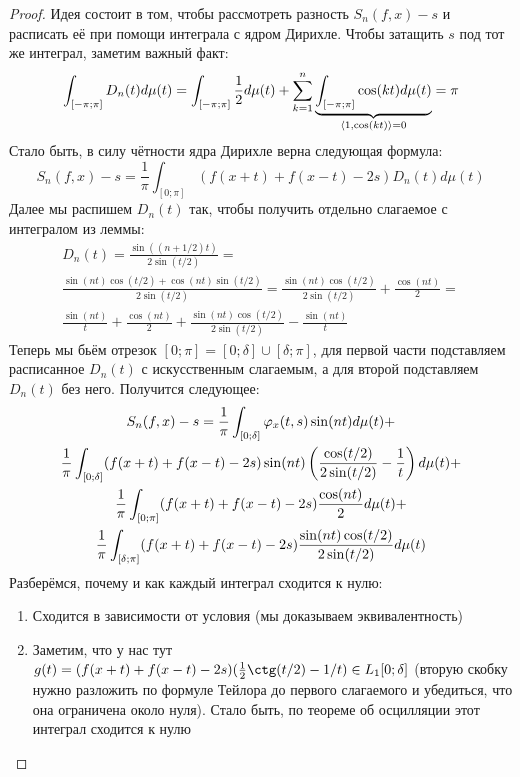 \begin{proof}
	Идея состоит в том, чтобы рассмотреть разность $S_n(f, x) - s$ и расписать её при помощи интеграла с ядром Дирихле. Чтобы затащить $s$ под тот же интеграл, заметим важный факт:
	\[
		\int_{[-\pi; \pi]} D_n(t)d\mu(t) = \int_{[-\pi; \pi]} \frac{1}{2}d\mu(t) + \sum_{k = 1}^n \underbrace{\int_{[-\pi; \pi]} \cos(kt) d\mu(t)}_{\left\langle1, \cos(kt)\right\rangle = 0} = \pi
	\]
	Стало быть, в силу чётности ядра Дирихле верна следующая формула:
	\[
		S_n(f, x) - s = \frac{1}{\pi}\int_{[0; \pi]} (f(x + t) + f(x - t) - 2s)D_n(t)d\mu(t)
	\]
	Далее мы распишем $D_n(t)$ так, чтобы получить отдельно слагаемое с интегралом из леммы:
	\begin{multline*}
		D_n(t) = \frac{\sin((n + 1 / 2)t)}{2\sin(t / 2)} =
		\\
		\frac{\sin(nt)\cos(t / 2) + \cos(nt)\sin(t / 2)}{2\sin(t / 2)} = \frac{\sin(nt)\cos(t / 2)}{2\sin(t / 2)} + \frac{\cos(nt)}{2} =
		\\
		\frac{\sin(nt)}{t} + \frac{\cos(nt)}{2} + \frac{\sin(nt)\cos(t / 2)}{2\sin(t / 2)} - \frac{\sin(nt)}{t}
	\end{multline*}
	Теперь мы бьём отрезок $[0; \pi] = [0; \delta] \cup [\delta; \pi]$, для первой части подставляем расписанное $D_n(t)$ с искусственным слагаемым, а для второй подставляем $D_n(t)$ без него. Получится следующее:
	\begin{multline*}
		S_n(f, x) - s = \frac{1}{\pi}\int_{[0; \delta]} \varphi_x(t, s)\sin(nt)d\mu(t) +
		\\
		\frac{1}{\pi}\int_{[0; \delta]} (f(x + t) + f(x - t) - 2s) \sin(nt) \left(\frac{\cos(t / 2)}{2\sin(t / 2)} - \frac{1}{t}\right)d\mu(t) +
		\\
		\frac{1}{\pi} \int_{[0; \pi]} (f(x + t) + f(x - t) - 2s)\frac{\cos(nt)}{2}d\mu(t) +
		\\
		\frac{1}{\pi} \int_{[\delta; \pi]} (f(x + t) + f(x - t) - 2s) \frac{\sin(nt)\cos(t / 2)}{2\sin(t / 2)}d\mu(t)
  	\end{multline*}
 	Разберёмся, почему и как каждый интеграл сходится к нулю:
 	\begin{enumerate}
 		\item Сходится в зависимости от условия (мы доказываем эквивалентность)
 		
 		\item Заметим, что у нас тут $g(t) = (f(x + t) + f(x - t) - 2s)(\frac{1}{2}\ctg(t / 2) - 1 / t) \in L_1[0; \delta]$ (вторую скобку нужно разложить по формуле Тейлора до первого слагаемого и убедиться, что она ограничена около нуля). Стало быть, по теореме об осцилляции этот интеграл сходится к нулю
 		

\end{enumerate}
\end{proof}
